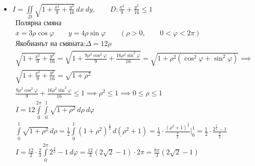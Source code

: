 \documentclass[a4paper,fleqn,12pt]{article}
\theoremstyle{definition}
\begin{document}
\begin{itemize}
\item $I = \iint\limits_D\sqrt{1 + \frac{x^2}{9} + \frac{y^2}{16}} \, dx \ dy , \qquad
D: \frac{x^2}{9} + \frac{y^2}{16} \leq 1$
\begin{gather*}
\text{Полярна смяна} \\
x = 3\rho \cos \varphi \qquad y = 4\rho \sin \varphi \qquad (\rho > 0, \qquad 0< \varphi < 2\pi )\\
\text{Якобианът на смяната:} \Delta = 12\rho \\
\sqrt{1 + \frac{x^2}{9} + \frac{y^2}{16}} = 
\sqrt{1 + \frac{9\rho^2 \cos^2 \varphi}{9} + \frac{16\rho^2 \sin^2 \varphi}{16}} = 
\sqrt{1 +\rho^2 (\cos^2 \varphi+\sin^2 \varphi)} \implies \\
\sqrt{1 + \frac{x^2}{9} + \frac{y^2}{16}} = \sqrt{1 +\rho^2} \\
\frac{9\rho^2 \cos^2 \varphi}{9} + \frac{16\rho^2 \sin^2 \varphi}{16} \leq 1 \implies \rho^2 \leq 1 \implies 0 \leq \rho \leq 1 \\
I = 12 \int\limits_0 ^{2\pi}  \int\limits_0 ^{1} \sqrt{1 +\rho^2} \, d\rho \ d\varphi\\
\int\limits_0 ^{1} \sqrt{1 +\rho^2} \, d\rho = 
\frac{1}{2}\int\limits_0 ^{1} (1 +\rho^2)^{\frac{1}{2}} \, d (\rho^2 + 1) =
\frac{1}{2} \cdot \frac{(\rho^2+1)^{\frac{3}{2}}}{\frac{3}{2}} \Big|_0 ^{1} =
\frac{1}{2} \cdot \frac{2^{\frac{3}{2}} - 1 }{\frac{3}{2}} \\
I = \frac{12}{2} \cdot \frac{2}{3} \int\limits_0 ^{2\pi} 2^{\frac{3}{2}} - 1 \, d\varphi = 
\frac{12}{3} (2\sqrt{2} - 1) \cdot 2\pi = \frac{8\pi}{3} (2\sqrt{2} - 1)
\end{gather*}
\end{itemize}
\end{document}
